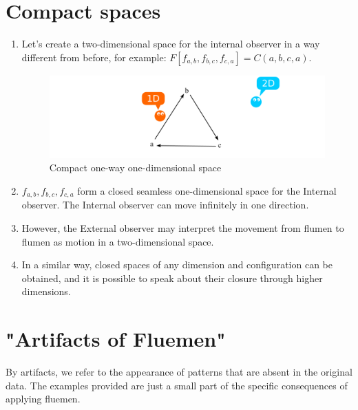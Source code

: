 \documentclass[final]{article}
\begin{document}
    \section{Compact spaces}
        \begin{enumerate}

            \item Let’s create a two-dimensional space for the internal observer in a way different from before, for example: \( F[f_{a,b},f_{b,c},f_{c,a}] = C(a,b,c,a) \).

            \begin{figure}[H]
                \centering
                \includegraphics[width=\textwidth]{./2d-f1f2f3-loop.png}
                \caption{Compact one-way one-dimensional space}
                \label{fig:image}
            \end{figure}

            \item \(f_{a,b},f_{b,c},f_{c,a}\) form a closed seamless one-dimensional space for the Internal observer. The Internal observer can move infinitely in one direction.

            \item However, the External observer may interpret the movement from flumen to flumen as motion in a two-dimensional space.

            \item In a similar way, closed spaces of any dimension and configuration can be obtained, and it is possible to speak about their closure through higher dimensions.

        \end{enumerate}


    \section{"Artifacts of Fluemen"}

        By artifacts, we refer to the appearance of patterns that are absent in 
        the original data. The examples provided are just a small part of the 
        specific consequences of applying fluemen.
\end{document}
